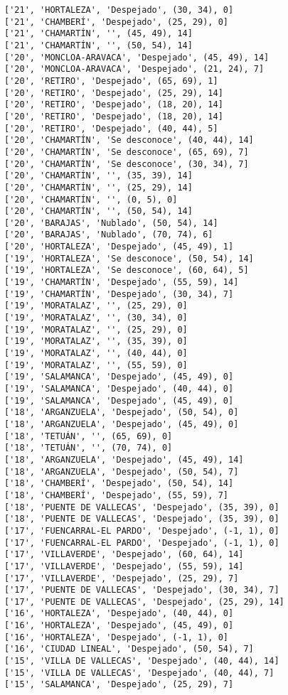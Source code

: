 \documentclass[11pt]{article}
\begin{document}
\begin{Verbatim}[commandchars=\\\{\}]
['21', 'HORTALEZA', 'Despejado', (30, 34), 0]
['21', 'CHAMBERÍ', 'Despejado', (25, 29), 0]
['21', 'CHAMARTÍN', '', (45, 49), 14]
['21', 'CHAMARTÍN', '', (50, 54), 14]
['20', 'MONCLOA-ARAVACA', 'Despejado', (45, 49), 14]
['20', 'MONCLOA-ARAVACA', 'Despejado', (21, 24), 7]
['20', 'RETIRO', 'Despejado', (65, 69), 1]
['20', 'RETIRO', 'Despejado', (25, 29), 14]
['20', 'RETIRO', 'Despejado', (18, 20), 14]
['20', 'RETIRO', 'Despejado', (18, 20), 14]
['20', 'RETIRO', 'Despejado', (40, 44), 5]
['20', 'CHAMARTÍN', 'Se desconoce', (40, 44), 14]
['20', 'CHAMARTÍN', 'Se desconoce', (65, 69), 7]
['20', 'CHAMARTÍN', 'Se desconoce', (30, 34), 7]
['20', 'CHAMARTÍN', '', (35, 39), 14]
['20', 'CHAMARTÍN', '', (25, 29), 14]
['20', 'CHAMARTÍN', '', (0, 5), 0]
['20', 'CHAMARTÍN', '', (50, 54), 14]
['20', 'BARAJAS', 'Nublado', (50, 54), 14]
['20', 'BARAJAS', 'Nublado', (70, 74), 6]
['20', 'HORTALEZA', 'Despejado', (45, 49), 1]
['19', 'HORTALEZA', 'Se desconoce', (50, 54), 14]
['19', 'HORTALEZA', 'Se desconoce', (60, 64), 5]
['19', 'CHAMARTÍN', 'Despejado', (55, 59), 14]
['19', 'CHAMARTÍN', 'Despejado', (30, 34), 7]
['19', 'MORATALAZ', '', (25, 29), 0]
['19', 'MORATALAZ', '', (30, 34), 0]
['19', 'MORATALAZ', '', (25, 29), 0]
['19', 'MORATALAZ', '', (35, 39), 0]
['19', 'MORATALAZ', '', (40, 44), 0]
['19', 'MORATALAZ', '', (55, 59), 0]
['19', 'SALAMANCA', 'Despejado', (45, 49), 0]
['19', 'SALAMANCA', 'Despejado', (40, 44), 0]
['19', 'SALAMANCA', 'Despejado', (45, 49), 0]
['18', 'ARGANZUELA', 'Despejado', (50, 54), 0]
['18', 'ARGANZUELA', 'Despejado', (45, 49), 0]
['18', 'TETUÁN', '', (65, 69), 0]
['18', 'TETUÁN', '', (70, 74), 0]
['18', 'ARGANZUELA', 'Despejado', (45, 49), 14]
['18', 'ARGANZUELA', 'Despejado', (50, 54), 7]
['18', 'CHAMBERÍ', 'Despejado', (50, 54), 14]
['18', 'CHAMBERÍ', 'Despejado', (55, 59), 7]
['18', 'PUENTE DE VALLECAS', 'Despejado', (35, 39), 0]
['18', 'PUENTE DE VALLECAS', 'Despejado', (35, 39), 0]
['17', 'FUENCARRAL-EL PARDO', 'Despejado', (-1, 1), 0]
['17', 'FUENCARRAL-EL PARDO', 'Despejado', (-1, 1), 0]
['17', 'VILLAVERDE', 'Despejado', (60, 64), 14]
['17', 'VILLAVERDE', 'Despejado', (55, 59), 14]
['17', 'VILLAVERDE', 'Despejado', (25, 29), 7]
['17', 'PUENTE DE VALLECAS', 'Despejado', (30, 34), 7]
['17', 'PUENTE DE VALLECAS', 'Despejado', (25, 29), 14]
['16', 'HORTALEZA', 'Despejado', (40, 44), 0]
['16', 'HORTALEZA', 'Despejado', (45, 49), 0]
['16', 'HORTALEZA', 'Despejado', (-1, 1), 0]
['16', 'CIUDAD LINEAL', 'Despejado', (50, 54), 7]
['15', 'VILLA DE VALLECAS', 'Despejado', (40, 44), 14]
['15', 'VILLA DE VALLECAS', 'Despejado', (40, 44), 7]
['15', 'SALAMANCA', 'Despejado', (25, 29), 7]

\end{Verbatim}
\end{document}
